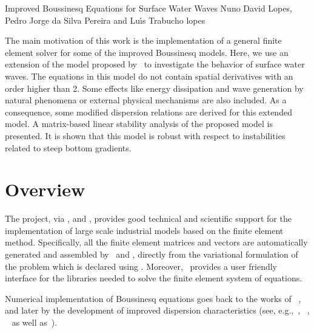  {Improved Boussinesq Equations for Surface
  Water Waves} {Nuno David Lopes, Pedro Jorge da Silva Pereira and
  Lu{\'\i}s Trabucho} {lopes}


The main motivation of this work is the implementation of a
general finite element solver for some of the improved Boussinesq
models.  Here, we use an extension
of the model proposed by~\cite{ZhaoTengCheng2004} to
investigate the behavior of surface water waves. The
equations in this model do not contain spatial derivatives
with an order higher than 2. Some effects like
 energy dissipation and wave generation by natural
phenomena or external physical mechanisms are also included.
As a consequence, some modified dispersion relations are
derived for this extended model. A matrix-based linear
stability analysis of the proposed model is presented.
It is shown that this model is robust with respect to
instabilities related to steep bottom gradients.

\section{Overview}
The \fenics project, via \dolfin, \ufl and \ffc, provides
good technical and scientific support for the implementation
of large scale industrial models based on the finite element
method. Specifically, all the
finite element matrices and vectors are automatically
generated and assembled by \dolfin\ and \ffc, directly from
the variational formulation of the problem which is declared
using \ufl. Moreover, \dolfin\ provides a user friendly
interface for the libraries needed to solve the finite
element system of equations.

Numerical implementation of Boussinesq equations goes
back to the works of ~\cite{Peregrine1967}, ~\cite{Wu1981} and  later by the
development of improved dispersion characteristics
(see, e.g.,~\cite{MadsenEtAl1991},
~\cite{Nwogu1993}, ~\cite{ChenLiu1994}
as well as~\cite{BejiNadaoka1996}).

